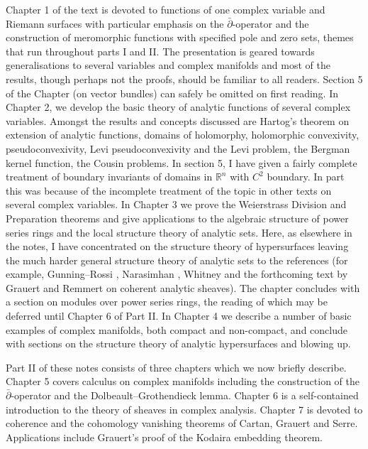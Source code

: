 Chapter 1 of the text is devoted to functions of one complex variable and Riemann surfaces with particular emphasis on the $\bar\partial$-operator and the construction of meromorphic functions with specified pole and zero sets, themes that run throughout parts I and II. The presentation is geared towards generalisations to several variables and complex manifolds and most of the results, though perhaps not the proofs, should be familiar to all readers. Section 5 of the Chapter (on vector bundles) can safely be omitted on first reading. In Chapter 2, we develop the basic theory of analytic functions of several complex variables. Amongst the results and concepts discussed are Hartog's theorem on extension of analytic functions, domains of holomorphy, holomorphic convexivity, pseudoconvexivity, Levi pseudoconvexivity and the Levi problem, the Bergman kernel function, the Cousin problems. In section 5, I have given a fairly complete treatment of boundary invariants of domains in $\mathbb R^n$ with $C^2$ boundary. In part this was because of the incomplete treatment of the topic in other texts on several complex variables. In Chapter 3 we prove the Weierstrass Division and Preparation theorems and give applications to the algebraic structure of power series rings and the local structure theory of analytic sets. Here, as elsewhere in the notes, I have concentrated on the structure theory of hypersurfaces leaving the much harder general structure theory of analytic sets to the references (for example, Gunning--Rossi \cite{bib:I:gunning-r-c-and-rossi-h:1}, Narasimhan \cite{bib:I:narasimhan-r:3}, Whitney \cite{bib:I:whitney-h:1} and the forthcoming text by Grauert and Remmert on coherent analytic sheaves). The chapter concludes with a section on modules over power series rings, the reading of which may be deferred until Chapter 6 of Part II. In Chapter 4 we describe a number of basic examples of complex manifolds, both compact and non-compact, and conclude with sections on the structure theory of analytic hypersurfaces and blowing up.

Part II of these notes consists of three chapters which we now briefly describe. Chapter 5 covers calculus on complex manifolds including the construction of the $\bar\partial$-operator and the Dolbeault--Grothendieck lemma. Chapter 6 is a self-contained introduction to the theory of sheaves in complex analysis. Chapter 7 is devoted to coherence and the cohomology vanishing theorems of Cartan, Grauert and Serre. Applications include Grauert's proof of the Kodaira embedding theorem.

